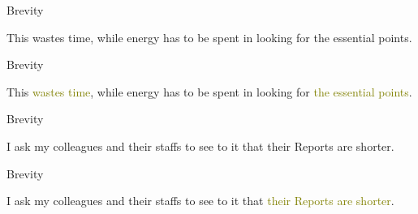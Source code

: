 \documentclass[
  ignorenonframetext,
]{beamer}
\begin{document}
\begin{frame}{Brevity}
\protect\hypertarget{brevity-3}{}
\Large

This wastes time, while energy has to be spent in looking for the
essential points.

\par

\vfill\Huge


\vfill
\end{frame}

\begin{frame}{Brevity}
\protect\hypertarget{brevity-4}{}
\Large

This \textcolor{olive}{wastes time}, while energy has to be spent in
looking for \textcolor{olive}{the essential points}.

\par

\vfill\Huge


\vfill
\end{frame}

\begin{frame}{Brevity}
\protect\hypertarget{brevity-5}{}
\Large

I ask my colleagues and their staffs to see to it that their Reports are
shorter.

\vfill\Huge


\vfill
\end{frame}

\begin{frame}{Brevity}
\protect\hypertarget{brevity-6}{}
\Large

I ask my colleagues and their staffs to see to it that
\textcolor{olive}{their Reports are shorter}.

\vfill\Huge


\vfill
\end{frame}
\end{document}
